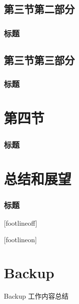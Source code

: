 \documentclass[xetex,mathserif,serif,handout]{beamer}
\begin{document}
\subsection{第三节第二部分}
\begin{frame}
	\frametitle{标题}
\end{frame}
\subsection{第三节第三部分}
\begin{frame}
	\frametitle{标题}
\end{frame}

\section{第四节}
\begin{frame}
	\frametitle{标题}
\end{frame}

\section{总结和展望}
\begin{frame}
	\frametitle{标题}
\end{frame}

[footlineoff]%
\begin{frame}[noframenumbering]
	\thanks
\end{frame}
[footlineon]%

\section*{Backup}
\begin{frame}[noframenumbering]{Backup}
	工作内容总结
\end{frame}
\end{document}
